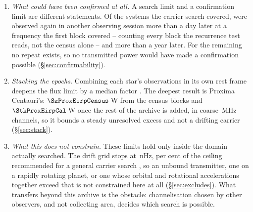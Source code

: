 \begin{enumerate}[leftmargin=1.6em,itemsep=4pt,topsep=4pt,parsep=0pt]
\item \emph{What could have been confirmed at all.} A search limit and a
confirmation limit are different statements. Of the \NSysClassA{} systems the
carrier search covered, \ZcConfSysDay{} were observed again in another
observing session more than a day later at a frequency the first block
covered -- counting every
block the recurrence test reads, not the census alone -- and \ZcConfSysYr{}
more than a year later. For the remaining \ZcNoRepSys{} no repeat exists, so
no transmitted power would have made a confirmation possible
(\S\ref{sec:confirmability}).

\item \emph{Stacking the epochs.} Combining each star's observations in its
own rest frame deepens the flux limit by a median factor \SyStkGainMed. The
deepest result is Proxima Centauri's: $\SzProxEirpCensus$\,W from the census
blocks and $\StkProxEirpCal$\,W once the rest of the archive is added, in
coarse \ChanBModeMHz\,MHz channels, so it bounds a steady unresolved excess
and not a drifting carrier (\S\ref{sec:stack}).

\item \emph{What this does not constrain.} These limits hold only inside the
domain actually searched. The drift grid stops at \DriftCeilLo\,nHz,
\AccelSheikhPct{} per cent of the ceiling recommended for a general carrier
search \citep{Sheikh2019}, so an unbound transmitter, one on a rapidly
rotating planet, or one whose orbital and rotational accelerations together
exceed that is not constrained here at all (\S\ref{sec:excludes}). What
transfers beyond this archive is the obstacle: channelisation chosen by other
observers, and not collecting area, decides which search is possible.

\end{enumerate}
